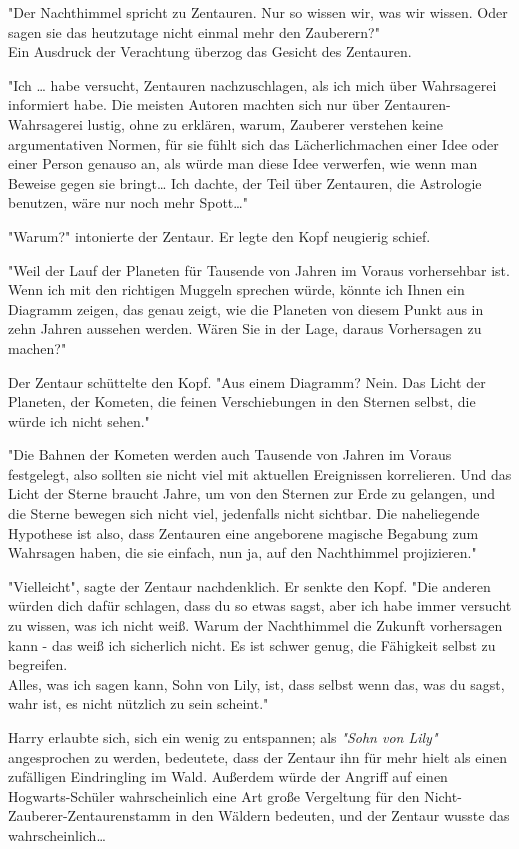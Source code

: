{"Der Nachthimmel spricht zu Zentauren. Nur so wissen wir, was wir wissen. Oder sagen sie das heutzutage nicht einmal mehr den Zauberern?"\\ Ein Ausdruck der Verachtung überzog das Gesicht des Zentauren.

"Ich … habe versucht, Zentauren nachzuschlagen, als ich mich über Wahrsagerei informiert habe. Die meisten Autoren machten sich nur über Zentauren-Wahrsagerei lustig, ohne zu erklären, warum, Zauberer verstehen keine argumentativen Normen, für sie fühlt sich das Lächerlichmachen einer Idee oder einer Person genauso an, als würde man diese Idee verwerfen, wie wenn man Beweise gegen sie bringt… Ich dachte, der Teil über Zentauren, die Astrologie benutzen, wäre nur noch mehr Spott…"

"Warum?" intonierte der Zentaur. Er legte den Kopf neugierig schief.

"Weil der Lauf der Planeten für Tausende von Jahren im Voraus vorhersehbar ist. Wenn ich mit den richtigen Muggeln sprechen würde, könnte ich Ihnen ein Diagramm zeigen, das genau zeigt, wie die Planeten von diesem Punkt aus in zehn Jahren aussehen werden. Wären Sie in der Lage, daraus Vorhersagen zu machen?"

Der Zentaur schüttelte den Kopf. "Aus einem Diagramm? Nein. Das Licht der Planeten, der Kometen, die feinen Verschiebungen in den Sternen selbst, die würde ich nicht sehen."

"Die Bahnen der Kometen werden auch Tausende von Jahren im Voraus festgelegt, also sollten sie nicht viel mit aktuellen Ereignissen korrelieren. Und das Licht der Sterne braucht Jahre, um von den Sternen zur Erde zu gelangen, und die Sterne bewegen sich nicht viel, jedenfalls nicht sichtbar. Die naheliegende Hypothese ist also, dass Zentauren eine angeborene magische Begabung zum Wahrsagen haben, die sie einfach, nun ja, auf den Nachthimmel projizieren."

"Vielleicht", sagte der Zentaur nachdenklich. Er senkte den Kopf. "Die anderen würden dich dafür schlagen, dass du so etwas sagst, aber ich habe immer versucht zu wissen, was ich nicht weiß. Warum der Nachthimmel die Zukunft vorhersagen kann - das weiß ich sicherlich nicht. Es ist schwer genug, die Fähigkeit selbst zu begreifen.\\ Alles, was ich sagen kann, Sohn von Lily, ist, dass selbst wenn das, was du sagst, wahr ist, es nicht nützlich zu sein scheint."

Harry erlaubte sich, sich ein wenig zu entspannen; als \emph{"Sohn von Lily"} angesprochen zu werden, bedeutete, dass der Zentaur ihn für mehr hielt als einen zufälligen Eindringling im Wald. Außerdem würde der Angriff auf einen Hogwarts-Schüler wahrscheinlich eine Art große Vergeltung für den Nicht-Zauberer-Zentaurenstamm in den Wäldern bedeuten, und der Zentaur wusste das wahrscheinlich…

}
